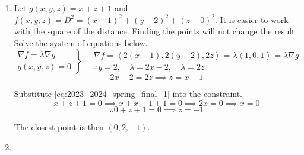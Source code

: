 \documentclass[a4paper, 12pt]{article}
\renewcommand{\headrulewidth}{0pt}
\begin{document}
\newpage
\pagestyle{fancy}
\renewcommand{\headrulewidth}{1pt}


\begin{enumerate}[leftmargin=*,label=\textbf{\arabic*.}]
\item Let $g(x,y,z)=x+z+1$ and $f(x,y,z)=D^2=(x-1)^2+(y-2)^2+(z-0)^2$. It is easier to work with the square of the distance. Finding the points will not change the result. Solve the system of equations below.
\[
\left.
\begin{array}{l}
\displaystyle\nabla f=\lambda\nabla g \\
\displaystyle g(x,y,z)=0
\end{array}
\right\}\quad
\begin{array}{l}
\nabla f=\left\langle2(x-1),2(y-2),2z\right\rangle=\lambda\left\langle1,0,1\right\rangle=\lambda\nabla g\\\therefore y=2, \quad\lambda=2x-2,\quad\lambda=2z
\end{array}
\]
\begin{equation}2x-2=2z\implies z=x-1\label{eq:2023_2024_spring_final_1}\end{equation}

Substitute \eqref{eq:2023_2024_spring_final_1} into the constraint.
\[x+z+1=0\implies x+x-1+1=0\implies2x=0\implies x=0\]
\[\therefore 0+z+1=0\implies z=-1\]

The closest point is then $\boxed{(0,2,-1)}$.

\item\leavevmode
\vspace{-2em}
\begin{center}
\begin{minipage}{0.6\textwidth}
\end{minipage}
\end{center}
\end{enumerate}
\end{document}
